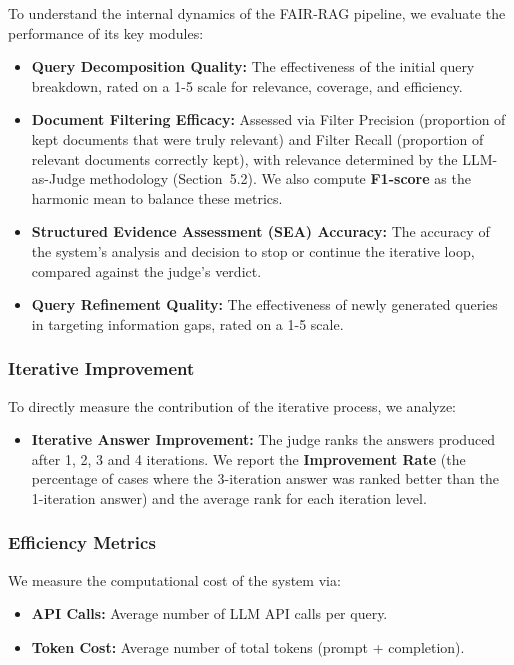 \documentclass[11pt]{article}
\begin{document}
To understand the internal dynamics of the FAIR-RAG pipeline, we evaluate the performance of its key modules:

\begin{itemize}
    \item \textbf{Query Decomposition Quality:} The effectiveness of the initial query breakdown, rated on a 1-5 scale for relevance, coverage, and efficiency.
    \item \textbf{Document Filtering Efficacy:} Assessed via Filter Precision (proportion of kept documents that were truly relevant) and Filter Recall (proportion of relevant documents correctly kept), with relevance determined by the LLM-as-Judge methodology (Section~5.2). We also compute \textbf{F1-score} as the harmonic mean to balance these metrics.
    \item \textbf{Structured Evidence Assessment (SEA) Accuracy:} The accuracy of the system's analysis and decision to stop or continue the iterative loop, compared against the judge's verdict.
    \item \textbf{Query Refinement Quality:} The effectiveness of newly generated queries in targeting information gaps, rated on a 1-5 scale.
\end{itemize}

\subsubsection{Iterative Improvement}

To directly measure the contribution of the iterative process, we analyze:

\begin{itemize}
    \item \textbf{Iterative Answer Improvement:} The judge ranks the answers produced after 1, 2, 3 and 4 iterations. We report the \textbf{Improvement Rate} (the percentage of cases where the 3-iteration answer was ranked better than the 1-iteration answer) and the average rank for each iteration level.
\end{itemize}

\subsubsection{Efficiency Metrics}

We measure the computational cost of the system via:

\begin{itemize}
    \item \textbf{API Calls:} Average number of LLM API calls per query.
    \item \textbf{Token Cost:} Average number of total tokens (prompt + completion).
\end{itemize}
\end{document}
